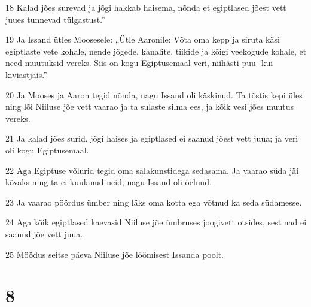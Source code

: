 \par 18 Kalad jões surevad ja jõgi hakkab haisema, nõnda et egiptlased jõest vett juues tunnevad tülgastust.”
\par 19 Ja Issand ütles Moosesele: „Ütle Aaronile: Võta oma kepp ja siruta käsi egiptlaste vete kohale, nende jõgede, kanalite, tiikide ja kõigi veekogude kohale, et need muutuksid vereks. Siis on kogu Egiptusemaal veri, niihästi puu- kui kiviastjais.”
\par 20 Ja Mooses ja Aaron tegid nõnda, nagu Issand oli käskinud. Ta tõstis kepi üles ning lõi Niiluse jõe vett vaarao ja ta sulaste silma ees, ja kõik vesi jões muutus vereks.
\par 21 Ja kalad jões surid, jõgi haises ja egiptlased ei saanud jõest vett juua; ja veri oli kogu Egiptusemaal.
\par 22 Aga Egiptuse võlurid tegid oma salakunstidega sedasama. Ja vaarao süda jäi kõvaks ning ta ei kuulanud neid, nagu Issand oli öelnud.
\par 23 Ja vaarao pöördus ümber ning läks oma kotta ega võtnud ka seda südamesse.
\par 24 Aga kõik egiptlased kaevasid Niiluse jõe ümbruses joogivett otsides, sest nad ei saanud jõe vett juua.
\par 25 Möödus seitse päeva Niiluse jõe löömisest Issanda poolt.

\chapter{8}

